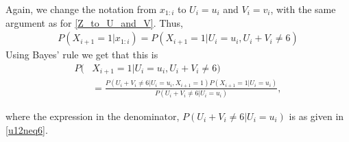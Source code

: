 Again, we change the notation from $x_{1:i}$ to $U_i=u_i$ and $V_i=v_i$, with the same argument as for \eqref{Z_to_U_and_V}. Thus,
\begin{equation}
    \begin{aligned}
        P(X_{i+1}=1|x_{1:i}) = P(X_{i+1}=1|U_i=u_i,U_i+V_i\neq6)
    \end{aligned}
\end{equation}
Using Bayes' rule we get that this is
\begin{equation}
\label{nextisred_bayes_rule}
    \begin{aligned}
        P(&X_{i+1}=1|U_i=u_i,U_i+V_i\neq6) \\[6pt]
        &= \frac{P(U_i+V_i\neq6|U_i=u_i,X_{i+1}=1)P(X_{i+1}=1|U_i=u_i)}
        {P(U_i+V_i\neq6|U_i=u_i)},
    \end{aligned}
\end{equation}

where the expression in the denominator, $P(U_i+V_i\neq6|U_i=u_i)$ is as given in \eqref{u12neq6}. 

